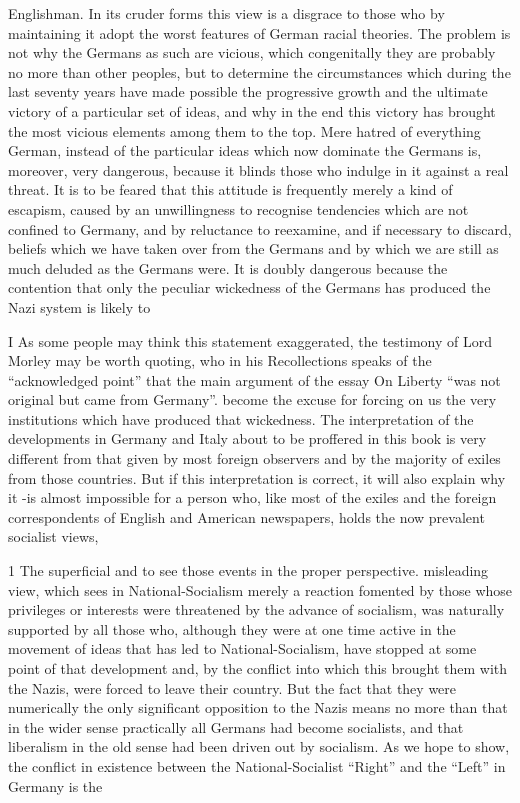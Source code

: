 \documentclass[11pt,openany]{book}
\begin{document}
Englishman. In its cruder forms this view is a disgrace to those who by maintaining it adopt the worst features of German racial theories. The problem is not why the Germans as such are vicious, which congenitally they are probably no more than other peoples, but to determine the circumstances which during the last seventy years have made possible the progressive growth and the ultimate victory of a particular set of ideas, and why in the end this victory has brought the most vicious elements among them to the top. Mere hatred of everything German, instead of the particular ideas which now dominate the Germans is, moreover, very dangerous, because it blinds those who indulge in it against a real threat. It is to be feared that this attitude is frequently merely a kind of escapism, caused by an unwillingness to recognise tendencies which are not confined to Germany, and by reluctance to reexamine, and if necessary to discard, beliefs which we have taken over from the Germans and by which we are still as much deluded as the Germans were. It is doubly dangerous because the contention that only the peculiar wickedness of the Germans has produced the Nazi system is likely to

I As some people may think this statement exaggerated, the testimony of Lord Morley may be worth quoting, who in his Recollections speaks of the ``acknowledged point'' that the main argument of the essay On Liberty ``was not original but came from Germany''. become the excuse for forcing on us the very institutions which have produced that wickedness. The interpretation of the developments in Germany and Italy about to be proffered in this book is very different from that given by most foreign observers and by the majority of exiles from those countries. But if this interpretation is correct, it will also explain why it -is almost impossible for a person who, like most of the exiles and the foreign correspondents of English and American newspapers, holds the now prevalent socialist views,

1 The superficial and to see those events in the proper perspective. misleading view, which sees in National-Socialism merely a reaction fomented by those whose privileges or interests were threatened by the advance of socialism, was naturally supported by all those who, although they were at one time active in the movement of ideas that has led to National-Socialism, have stopped at some point of that development and, by the conflict into which this brought them with the Nazis, were forced to leave their country. But the fact that they were numerically the only significant opposition to the Nazis means no more than that in the wider sense practically all Germans had become socialists, and that liberalism in the old sense had been driven out by socialism. As we hope to show, the conflict in existence between the National-Socialist ``Right'' and the ``Left'' in Germany is the
\end{document}
